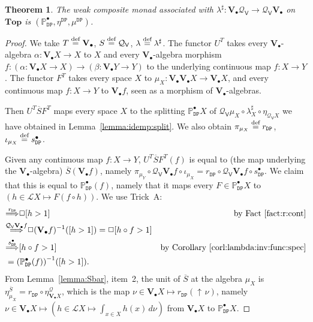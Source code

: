 \documentclass[preprint,12pt]{elsarticle}
\newcommand\eqdef{\mathrel{\buildrel \text{def}\over=}}
\DeclareMathOperator{\upc}{\uparrow\!}
\newcommand\Lform{\mathcal L}
\newcommand\Pred{\mathbb{P}}
\newcommand\Demon{{\mathtt{D}}}
\newcommand\Nature{{\mathtt{P}}}
\newcommand\DN{{\Demon\Nature}}
\newcommand\invto[1]{{\buildrel {#1} \over\Longrightarrow}}
\newcommand\Smyth{{\mathcal Q}}
\newcommand\Vt{\mathsf{V}}
\newcommand\SV{\Smyth_{\Vt}}
\newcommand\Val{{\mathbf V}}
\newcommand\Topcat{\mathbf{Top}}
\newtheorem{theorem}{Theorem}[section]
\begin{document}
\begin{theorem}
  \label{thm:weaklift}
  The weak composite monad associated with
  $\lambda^\sharp \colon \Val_\bullet {\SV} \to \SV {\Val_\bullet}$ on
  $\Topcat$ is $(\Pred_\DN^\bullet, \eta^\DN, \mu^\DN)$.
\end{theorem}
\begin{proof}
  We take $T \eqdef \Val_\bullet$, $S \eqdef \SV$,
  $\lambda \eqdef \lambda^\sharp$.  The functor $U^T$ takes every
  $\Val_\bullet$-algebra $\alpha \colon \Val_\bullet X \to X$ to $X$
  and every $\Val_\bullet$-algebra morphism
  $f \colon (\alpha \colon \Val_\bullet X \to X) \to (\beta \colon
  \Val_\bullet Y \to Y)$ to the underlying continuous map
  $f \colon X \to Y$.  The functor $F^T$ takes every space $X$ to
  $\mu_X \colon \Val_\bullet {\Val_\bullet X} \to \Val_\bullet X$, and
  every continuous map $f \colon X \to Y$ to $\Val_\bullet f$, seen as
  a morphism of $\Val_\bullet$-algebras.

  Then $U^T \overline S F^T$ maps every space $X$ to the splitting
  $\Pred_\DN^\bullet X$ of
  $\SV {\mu_X} \circ {\lambda^\sharp_X} \circ \eta_{\SV X}$ we have obtained in
  Lemma~\ref{lemma:idemp:split}.  We also obtain
  $\pi_{\mu_X} \eqdef r_\DN$, $\iota_{\mu_X} \eqdef s_\DN^\bullet$.

  Given any continuous map $f \colon X \to Y$, $U^T \overline S F^T
  (f)$ is equal to (the map underlying the $\Val_\bullet$-algebra)
  $\overline S (\Val_\bullet f)$, namely $\pi_{\mu_Y} \circ \SV
  {\Val_\bullet f} \circ \iota_{\mu_X} = r_\DN \circ \SV
  {\Val_\bullet f} \circ s_\DN^\bullet$.  We claim that this is equal
  to $\Pred_\DN^\bullet (f)$, namely that it maps every $F \in
  \Pred_\DN^\bullet X$ to $(h \in \Lform X \mapsto F (f \circ h))$.
  We use Trick~A:
  \begin{align*}
    [h > 1]
    & \invto{r_\DN}
      \Box {[h > 1]}
    & \text{by Fact~\ref{fact:r:cont}} \\
    & \invto{\SV {\Val_\bullet f}}
      \Box {(\Val_\bullet f)^{-1} ([h > 1])}
      = \Box {[h \circ f > 1]} \\
    & \invto{s_\DN^\bullet}
      [h \circ f > 1]
    & \text{by Corollary~\ref{corl:lambda:inv:func:spec}} \\
    & = {(\Pred_\DN^\bullet (f))}^{-1} ([h > 1]).
  \end{align*}
  From Lemma~\ref{lemma:Sbar}, item~2, the unit of $\overline S$ at
  the algebra $\mu_X$ is
  $\eta^{\overline S}_{\mu_X} = r_\DN \circ \eta^\Smyth_{\Val_\bullet
    X}$, which is the map
  $\nu \in \Val_\bullet X \mapsto r_\DN (\upc \nu)$, namely
  $\nu \in \Val_\bullet X \mapsto (h \in \Lform X \mapsto \int_{x \in
    X} h (x) \,d\nu)$ from $\Val_\bullet X$ to $\Pred_\DN^\bullet X$.


\end{proof}
\end{document}
